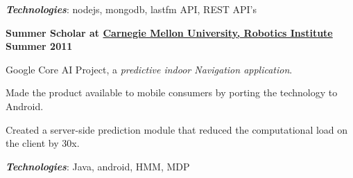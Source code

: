 \vspace{0.2cm}
\hspace{0.25cm}\textbf{\textit{Technologies}}: 
nodejs, mongodb, lastfm API, REST API's

\vspace{0.4cm}

\textbf{Summer Scholar at \href{http://www.ri.cmu.edu/}{Carnegie Mellon University, Robotics Institute}}
\hfill \textbf{Summer 2011}
\vspace{0.1cm}

Google Core AI Project, a \textit{predictive indoor Navigation application}.

\vspace{0.1cm}
\begin{innerlist}
\item Made the product available to mobile consumers by porting the technology to Android.
\item Created a server-side prediction module that reduced the computational load on the client by 30x.
\end{innerlist}

\vspace{0.2cm}
\hspace{0.25cm}\textbf{\textit{Technologies}}: 
Java, android, HMM, MDP


